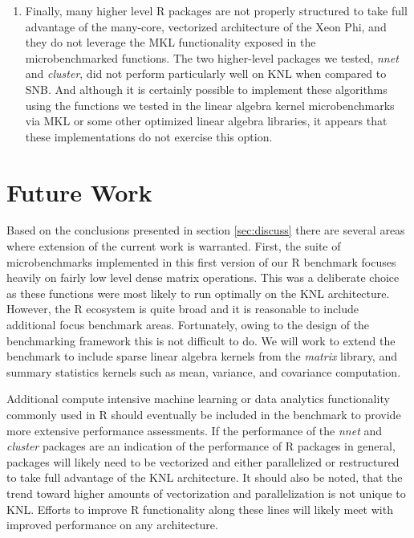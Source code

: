 \begin{enumerate}
\item Finally, many higher level R packages are not properly structured to take full
advantage of the many-core, vectorized architecture of the Xeon Phi, and they do not
leverage the MKL functionality exposed in the microbenchmarked functions. The two
higher-level packages we tested, \textit{nnet} and \textit{cluster}, did not perform
particularly well on KNL when compared to SNB. And although it is certainly possible to
implement these algorithms using the functions we tested in the linear algebra kernel
microbenchmarks via MKL or some other optimized linear algebra libraries, it appears that
these implementations do not exercise this option.

\end{enumerate}

\section{Future Work} \label{sec:future}

Based on the conclusions presented in section \ref{sec:discuss} there are several areas
where extension of the current work is warranted. First, the suite of microbenchmarks
implemented in this first version of our R benchmark focuses heavily on fairly low level
dense matrix operations. This was a deliberate choice as these functions were most likely
to run optimally on the KNL architecture. However, the R ecosystem is quite broad and it
is reasonable to include additional focus benchmark areas. Fortunately, owing to the
design of the benchmarking framework this is not difficult to do. We will work to extend
the benchmark to include sparse linear algebra kernels from the \textit{matrix} library,
and summary statistics kernels such as mean, variance, and covariance computation.

Additional compute intensive machine learning or data analytics functionality commonly
used in R should eventually be included in the benchmark to provide more extensive
performance assessments. If the performance of the \textit{nnet} and \textit{cluster}
packages are an indication of the performance of R packages in general, packages will
likely need to be vectorized and either parallelized or restructured to take full
advantage of the KNL architecture. It should also be noted, that the trend toward higher
amounts of vectorization and parallelization is not unique to KNL. Efforts to improve R
functionality along these lines will likely meet with improved performance on any
architecture.

